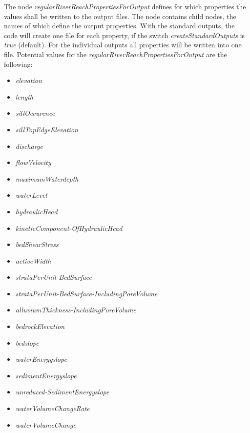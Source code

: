 \documentclass[11pt,a4paper]{article}
\begin{document}
The node \emph{regularRiverReachPropertiesForOutput} defines for which properties the values shall be written to the output files. The node contains child nodes, the names of which define the output properties. With the standard outputs, the code will create one file for each property, if the switch \emph{createStandardOutputs} is \emph{true} (default). For the individual outputs all properties will be written into one file. Potential values for the \emph{regularRiverReachPropertiesForOutput} are the following:

\begin{multicols}{3}
\begin{itemize}
	\item \emph{elevation}
	\item \emph{length}
	\item \emph{sillOccurence}
	\item \emph{sillTopEdgeElevation}
	\item \emph{discharge}
	\item \emph{flowVelocity}
	\item \emph{maximumWaterdepth}
	\item \emph{waterLevel}
	\item \emph{hydraulicHead}
	\item \emph{kineticComponent-}\emph{OfHydraulicHead}
	\item \emph{bedShearStress}
	\item \emph{activeWidth}
	\item \emph{strataPerUnit-}\emph{BedSurface}
	\item \emph{strataPerUnit-}\emph{BedSurface-}\emph{IncludingPoreVolume}
	\item \emph{alluviumThickness-}\emph{IncludingPoreVolume}
	\item \emph{bedrockElevation}
	\item \emph{bedslope}
	\item \emph{waterEnergyslope}
	\item \emph{sedimentEnergyslope}
	\item \emph{unreduced-}\emph{SedimentEnergyslope}
	\item \emph{waterVolumeChangeRate}
	\item \emph{waterVolumeChange}
\end{itemize}
\end{multicols}
\vspace{3ex}
\end{document}
